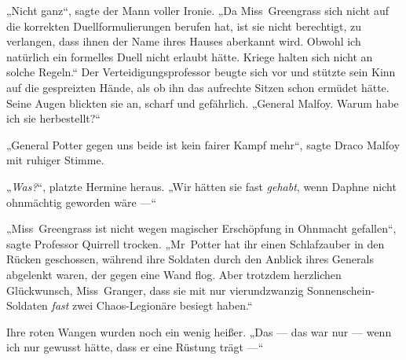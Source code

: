 „Nicht ganz“, sagte der Mann voller Ironie.
„Da Miss~Greengrass sich nicht auf die korrekten Duellformulierungen berufen hat, ist sie nicht berechtigt, zu verlangen, dass ihnen der Name ihres Hauses aberkannt wird. Obwohl ich natürlich ein formelles Duell nicht erlaubt hätte. Kriege halten sich nicht an solche Regeln.“ Der Verteidigungsprofessor beugte sich vor und stützte sein Kinn auf die gespreizten Hände, als ob ihn das aufrechte Sitzen schon ermüdet hätte. Seine Augen blickten sie an, scharf und gefährlich.
„General Malfoy. Warum habe ich sie herbestellt?“

„General Potter gegen uns beide ist kein fairer Kampf mehr“, sagte Draco Malfoy mit ruhiger Stimme.

„\emph{Was?}“, platzte Hermine heraus.
„Wir hätten sie fast \emph{gehabt}, wenn Daphne nicht ohnmächtig geworden wäre —“

„Miss~Greengrass ist nicht wegen magischer Erschöpfung in Ohnmacht gefallen“, sagte Professor Quirrell trocken.
„Mr~Potter hat ihr einen Schlafzauber in den Rücken geschossen, während ihre Soldaten durch den Anblick ihres Generals abgelenkt waren, der gegen eine Wand flog. Aber trotzdem herzlichen Glückwunsch, Miss~Granger, dass sie mit nur vierundzwanzig Sonnenschein-Soldaten \emph{fast} zwei Chaos-Legionäre besiegt haben.“

Ihre roten Wangen wurden noch ein wenig heißer.
„Das — das war nur — wenn ich nur gewusst hätte, dass er eine Rüstung trägt —“

